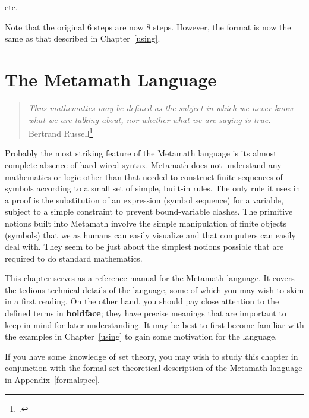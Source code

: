 \begin{center}
{etc.}
\end{center}

Note that the original 6 steps are now 8 steps.  However, the format is
now the same as that described in Chapter~\ref{using}.

\chapter{The Metamath Language}
\label{languagespec}

\begin{quote}
  {\em Thus mathematics may be defined as the subject in which we never know
what we are talking about, nor whether what we are saying is true.}
    \flushright\sc  Bertrand Russell\footnote{\cite[p.~84]{Russell2}.}\\
\end{quote}

Probably the most striking feature of the Metamath language is its almost
complete absence of hard-wired syntax. Metamath does not
understand any mathematics or logic other than that needed to construct finite
sequences of symbols according to a small set of simple, built-in rules.  The
only rule it uses in a proof is the substitution of an expression (symbol
sequence) for a variable, subject to a simple constraint to prevent
bound-variable clashes.  The primitive notions built into Metamath involve the
simple manipulation of finite objects (symbols) that we as humans can easily
visualize and that computers can easily deal with.  They seem to be just
about the simplest notions possible that are required to do standard
mathematics.

This chapter serves as a reference manual for the Metamath
language. It covers the tedious technical details of the language, some of
which you may wish to skim in a first reading.  On the other hand, you should
pay close attention to the defined terms in {\bf boldface}; they have precise
meanings that are important to keep in mind for later understanding.  It may
be best to first become familiar with the examples in Chapter~\ref{using} to
gain some motivation for the language.

If you have some knowledge of set theory, you may wish to study this
chapter in conjunction with the formal set-theoretical description of the
Metamath language in Appendix~\ref{formalspec}.

